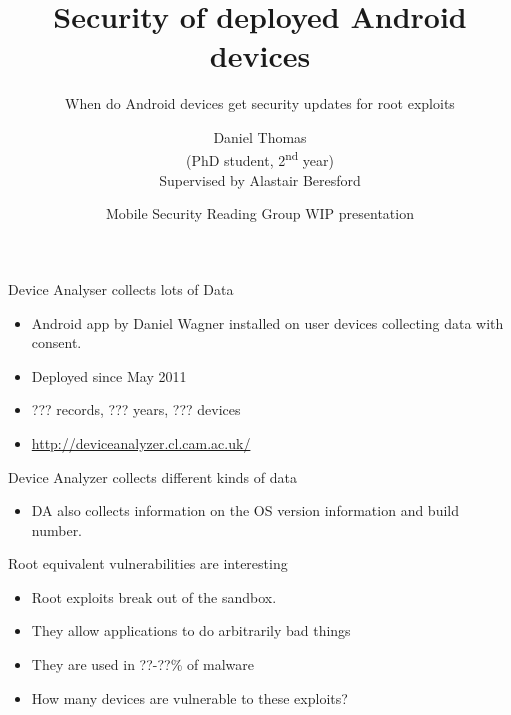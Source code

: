 \documentclass{beamer}
\title[Security Updates] %
{Security of deployed Android devices}
\subtitle
{When do Android devices get security updates for root exploits} %
\author[Daniel Thomas] %
{Daniel Thomas\\ \vspace{1em} \tiny{(PhD student, 2\textsuperscript{nd} year)} \\ \vspace{1em} \tiny{Supervised by Alastair Beresford}}
\institute{\vspace{-1em}
University of Cambridge
}
\date[2013-11-13] %
{Mobile Security Reading Group WIP presentation}
\begin{document}
\begin{frame}
  \titlepage
\end{frame}


\begin{frame}{Device Analyser collects lots of Data}{}
 \begin{itemize}
  \note{}
  \item Android app by Daniel Wagner installed on user devices collecting data with consent.
  \note{\\}
  \item Deployed since May 2011
  \note{\\}
  \item ??? records, ??? years, ??? devices
  \item \url{http://deviceanalyzer.cl.cam.ac.uk/}
 \end{itemize}
 \begin{center}
 \end{center}
\end{frame}

\begin{frame}{Device Analyzer collects different kinds of data}{}
 \begin{center}
   \hspace{1em}  \hspace{1em} 
 \end{center}
 \vspace{-1.5em}
 \begin{itemize}
  \item DA also collects information on the OS version information and build number.
  \note{}
 \end{itemize}
    
\end{frame}

\begin{frame}{Root equivalent vulnerabilities are interesting}{}
 \begin{itemize}
  \item Root exploits break out of the sandbox.
  \note{}
  \item They allow applications to do arbitrarily bad things
  \item They are used in ??-??\% of malware
  \item How many devices are vulnerable to these exploits?
 \end{itemize}
\end{frame}
\end{document}
